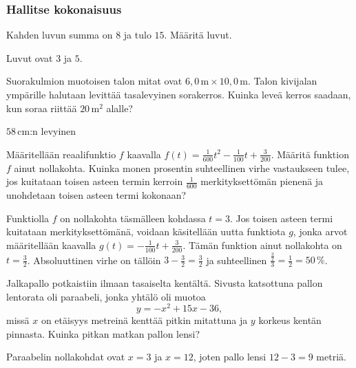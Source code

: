 \begin{tehtavasivu}

\subsubsection*{Hallitse kokonaisuus}

\begin{tehtava}
    Kahden luvun summa on $8$ ja tulo $15$. Määritä luvut.
    \begin{vastaus}
		Luvut ovat $3$ ja $5$.
    \end{vastaus}
\end{tehtava}

\begin{tehtava}
    Suorakulmion muotoisen talon mitat ovat $6,0\,\text{m} \times 10,0$\,m. Talon kivijalan ympärille halutaan levittää tasalevyinen sorakerros. Kuinka leveä kerros saadaan, kun soraa riittää $20$\,m$^2$ alalle?
    \begin{vastaus}
		$58$\,cm:n levyinen
    \end{vastaus}
\end{tehtava}

\begin{tehtava}
    Määritellään reaalifunktio $f$ kaavalla $f(t)=\frac{1}{600}t^2-\frac{1}{100}t+\frac{3}{200}$. Määritä funktion $f$ ainut nollakohta. Kuinka monen prosentin suhteellinen virhe vastaukseen tulee, jos kuitataan toisen asteen termin kerroin $\frac{1}{600}$ merkityksettömän pienenä ja unohdetaan toisen asteen termi kokonaan?
    \begin{vastaus}
Funktiolla $f$ on nollakohta täsmälleen kohdassa $t=3$. Jos toisen asteen termi kuitataan merkityksettömänä, voidaan käsitellään uutta funktiota $g$, jonka arvot määritellään kaavalla $g(t)=-\frac{1}{100}t+\frac{3}{200}$. Tämän funktion ainut nollakohta on $t=\frac{3}{2}$. Absoluuttinen virhe on tällöin $3-\frac{3}{2}=\frac{3}{2}$ ja suhteellinen $\frac{\frac{3}{2}}{3}=\frac{1}{2}=50\,\%$.
    \end{vastaus}
\end{tehtava}

\begin{tehtava}
	Jalkapallo potkaistiin ilmaan tasaiselta kentältä. Sivusta katsottuna pallon lentorata oli paraabeli, jonka yhtälö oli muotoa
	$$y=-x^2+15x-36,$$
	missä $x$ on etäisyys metreinä kenttää pitkin mitattuna ja $y$ korkeus kentän pinnasta. Kuinka pitkan matkan pallon lensi?
	\begin{vastaus}
		Paraabelin nollakohdat ovat $x=3$ ja $x=12$, joten pallo lensi $12-3 = 9$ metriä. 
	\end{vastaus}
\end{tehtava}


\end{tehtavasivu}
